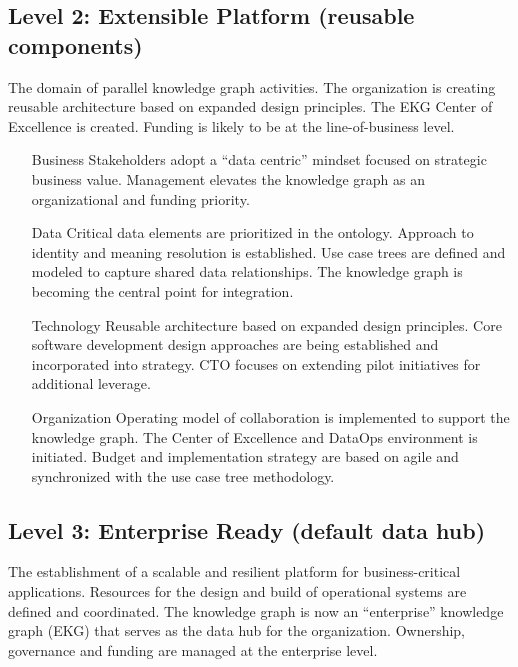 \subsection{Level 2: Extensible Platform (reusable components)}

The domain of parallel knowledge graph activities.
The organization is creating reusable architecture based on expanded design principles.
The EKG Center of Excellence is created.
Funding is likely to be at the line-of-business level.

\begin{itemize}[leftmargin=1in,font=\bfseries]

    \item[Business]     Stakeholders adopt a “data centric” mindset focused on strategic business value.
                        Management elevates the knowledge graph as an organizational and funding priority.
    \item[Data]         Critical data elements are prioritized in the ontology.
                        Approach to identity and meaning resolution is established.
                        Use case trees are defined and modeled to capture shared data relationships.
                        The knowledge graph is becoming the central point for integration.
    \item[Technology]   Reusable architecture based on expanded design principles.
                        Core software development design approaches are being established and incorporated
                        into strategy.
                        CTO focuses on extending pilot initiatives for additional leverage.
    \item[Organization] Operating model of collaboration is implemented to support the knowledge graph.
                        The Center of Excellence and DataOps environment is initiated.
                        Budget and implementation strategy are based on agile and synchronized with the
                        use case tree methodology.

\end{itemize}

\subsection{Level 3: Enterprise Ready (default data hub)}

The establishment of a scalable and resilient platform for business-critical applications.
Resources for the design and build of operational systems are defined and coordinated.
The knowledge graph is now an “enterprise” knowledge graph (EKG) that serves as the data hub for the organization.
Ownership, governance and funding are managed at the enterprise level.

